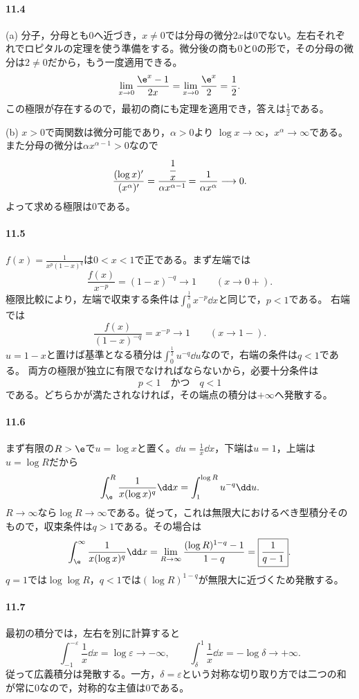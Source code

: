 \paragraph{11.4}
(a) 分子，分母とも$0$へ近づき，$x\ne0$では分母の微分$2x$は$0$でない。左右それぞれでロピタルの定理を使う準備をする。微分後の商も$0$と$0$の形で，その分母の微分は$2\ne0$だから，もう一度適用できる。
\[
 \lim_{x\to0}\frac{\e^x-1}{2x}
 =\lim_{x\to0}\frac{\e^x}{2}=\frac12.
\]
この極限が存在するので，最初の商にも定理を適用でき，答えは$\frac12$である。

(b) $x>0$で両関数は微分可能であり，$\alpha>0$より
$\log x\to\infty$，$x^\alpha\to\infty$である。また分母の微分は$\alpha x^{\alpha-1}>0$なので
\[
 \frac{(\log x)'}{(x^\alpha)'}
 =\cfrac{\cfrac1x}{\alpha x^{\alpha-1}}
 =\frac1{\alpha x^\alpha}\longrightarrow0.
\]
よって求める極限は$0$である。

\paragraph{11.5}
$f(x)=\frac1{x^p(1-x)^q}$は$0<x<1$で正である。まず左端では
\[
 \frac{f(x)}{x^{-p}}=(1-x)^{-q}\longrightarrow1
 \qquad(x\to0+).
\]
極限比較により，左端で収束する条件は$\int_0^{\frac12}x^{-p}\dd x$と同じで，$p<1$である。
右端では
\[
 \frac{f(x)}{(1-x)^{-q}}=x^{-p}\longrightarrow1
 \qquad(x\to1-).
\]
$u=1-x$と置けば基準となる積分は$\int_0^{\frac12}u^{-q}\dd u$なので，右端の条件は$q<1$である。
両方の極限が独立に有限でなければならないから，必要十分条件は
\[
 \boxed{p<1\quad\text{かつ}\quad q<1}
\]
である。どちらかが満たされなければ，その端点の積分は$+\infty$へ発散する。

\paragraph{11.6}
まず有限の$R>\e$で$u=\log x$と置く。$\dd u=\frac1x\dd x$，下端は$u=1$，上端は$u=\log R$だから
\[
 \int_{\e}^R\frac1{x(\log x)^q}\dd x
 =\int_1^{\log R}u^{-q}\dd u.
\]
$R\to\infty$なら$\log R\to\infty$である。従って，これは無限大におけるべき型積分そのもので，収束条件は$q>1$である。その場合は
\[
 \int_{\e}^{\infty}\frac1{x(\log x)^q}\dd x
 =\lim_{R\to\infty}\frac{(\log R)^{1-q}-1}{1-q}
 =\boxed{\frac1{q-1}}.
\]
$q=1$では$\log\log R$，$q<1$では$(\log R)^{1-q}$が無限大に近づくため発散する。

\paragraph{11.7}
最初の積分では，左右を別に計算すると
\[
 \int_{-1}^{-\varepsilon}\frac1x\dd x=\log\varepsilon\to-\infty,
 \qquad
 \int_{\delta}^{1}\frac1x\dd x=-\log\delta\to+\infty.
\]
従って広義積分は発散する。一方，$\delta=\varepsilon$という対称な切り取り方では二つの和が常に$0$なので，対称的な主値は$0$である。

